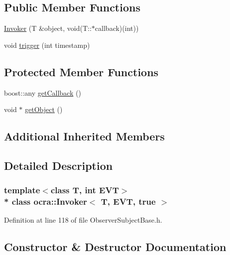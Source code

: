 \subsection*{Public Member Functions}
\begin{DoxyCompactItemize}
\item 
\hyperlink{classocra_1_1Invoker_3_01T_00_01EVT_00_01true_01_4_afba0606d59375568cb88fe02023c962e}{Invoker} (T \&object, void(T\+::$\ast$callback)(int))
\item 
void \hyperlink{classocra_1_1Invoker_3_01T_00_01EVT_00_01true_01_4_a9b6283c07e6477a21c4b82b17940d832}{trigger} (int timestamp)
\end{DoxyCompactItemize}
\subsection*{Protected Member Functions}
\begin{DoxyCompactItemize}
\item 
boost\+::any \hyperlink{classocra_1_1Invoker_3_01T_00_01EVT_00_01true_01_4_a902cb0e1084dc60929920a56631c8586}{get\+Callback} ()
\item 
void $\ast$ \hyperlink{classocra_1_1Invoker_3_01T_00_01EVT_00_01true_01_4_ab187a80065f38c9a650e0a5b35185153}{get\+Object} ()
\end{DoxyCompactItemize}
\subsection*{Additional Inherited Members}


\subsection{Detailed Description}
\subsubsection*{template$<$class T, int E\+VT$>$\\*
class ocra\+::\+Invoker$<$ T, E\+V\+T, true $>$}



Definition at line 118 of file Observer\+Subject\+Base.\+h.



\subsection{Constructor \& Destructor Documentation}
